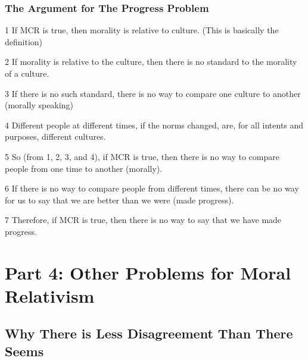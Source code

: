 \subsection{The Argument for The Progress Problem}
\begin{earg}
    \item[1] If MCR is true, then morality is relative to culture. (This is basically the definition)
    \item[2] If morality is relative to the culture, then there is no standard to the morality of a culture.
    \item[3] If there is no such standard, there is no way to compare one culture to another (morally speaking)
    \item[4] Different people at different times, if the norms changed, are, for all intents and purposes, different cultures.
    \item[5] So (from 1, 2, 3, and 4), if MCR is true, then there is no way to compare people from one time to another (morally).
    \item[6] If there is no way to compare people from different times, there can be no way for us to say that we are better than we were (made progress).
    \item[7] Therefore, if MCR is true, then there is no way to say that we have made progress.
\end{earg}

\chapter{Part 4: Other Problems for Moral Relativism}

\section{Why There is Less Disagreement Than There Seems}

